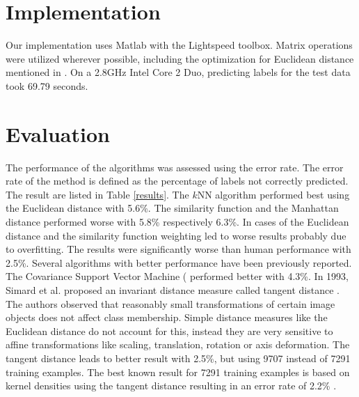 \documentclass[10pt,twocolumn,letterpaper]{article}
\begin{document}
\section{Implementation}
Our implementation uses Matlab with the Lightspeed toolbox. Matrix operations were utilized wherever possible, including the optimization for Euclidean distance mentioned in \cite{elkan}. On a 2.8GHz Intel Core 2 Duo, predicting labels for the test data took 	69.79 seconds.

\section{Evaluation}
The performance of the algorithms was assessed using the error rate. The error rate of the method is defined as the percentage of labels not correctly predicted. The result are listed in Table \ref{results}. The $k$NN algorithm performed best using the Euclidean distance with 5.6\%. The similarity function and the Manhattan distance performed worse with 5.8\% respectively 6.3\%. In cases of the Euclidean distance and the similarity function weighting led to worse results probably due to overfitting. The results were significantly worse than human performance with 2.5\%. Several algorithms with better performance have been previously reported. The Covariance Support Vector Machine (\cite{shivas} performed better with 4.3\%. In 1993, Simard et al. proposed an invariant distance measure called tangent distance \cite{Simard}. The authors observed that reasonably small transformations of certain image objects does not affect class membership. Simple distance measures like the Euclidean distance do not account for this, instead they are very sensitive to affine transformations like scaling, translation, rotation or axis deformation. The tangent distance leads to better result with 2.5\%, but using 9707 instead of 7291 training examples. The best known result for 7291 training examples is based on kernel densities using the tangent distance resulting in an error rate of 2.2\% \cite{keysers}.
\end{document}
